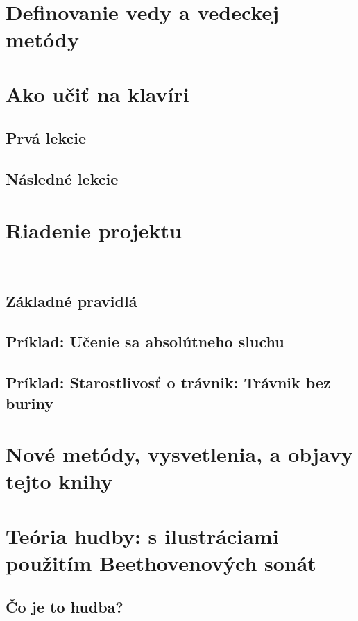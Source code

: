 \documentclass[11pt,a4paper%
]{article}
\begin{document}
\section{Definovanie vedy a vedeckej metódy}

\section{Ako učiť na klavíri}

\subsection{Prvá lekcie}

\subsection{Následné lekcie}

\section{Riadenie projektu}
\ 

\subsection{Základné pravidlá}

\subsection{Príklad: Učenie sa absolútneho sluchu}

\subsection{Príklad: Starostlivosť o trávnik: Trávnik bez buriny}

\section{Nové metódy, vysvetlenia, a objavy tejto knihy}

\section{Teória hudby: s ilustráciami použitím Beethovenových sonát}

\subsection{Čo je to hudba?}
\end{document}
